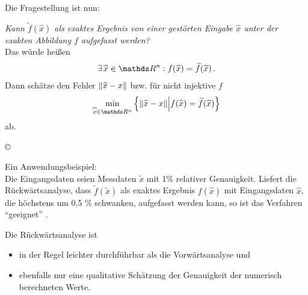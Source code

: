  
Die Fragestellung ist nun:

\textit{Kann $\widetilde{f}(\widehat{x})$ als exaktes Ergebnis von einer gestörten Eingabe $\widehat{x}$ unter der exakten Abbildung $f$ aufgefasst werden?}\\

Das würde heißen
\begin{gather*}
  \exists\, \widehat{x}\in \Ren: f(\widehat{x})= \widetilde{f}(\widetilde{x})\, .
\end{gather*}
Dann schätze den Fehler $ \nn[\widehat{x}-x]$
bzw. für nicht injektive $f$
\begin{gather*}
  \min_{\widehat{x}\in \Ren}
  \left\{
    \nn[\widehat{x}-x] 
    \middle\vert f(\widehat{x}) = \widetilde{f}(\widetilde{x}) 
  \right\}
\end{gather*} 
ab. 

\begin{image}{\copyright}
\end{image}

Ein Anwendungsbeispiel:\\
Die Eingangsdaten seien Messdaten $\tilde{x}$  mit 1\% relativer Genauigkeit. 
Liefert die Rückwärtsanalyse, dass $\tilde{f} (\tilde{x})$ als exaktes Ergebnis 
$f(\hat x)$ mit Eingangsdaten $\hat x$, 
die höchstens um 0,5 \% schwanken, aufgefasst werden kann,
so ist das Verfahren \enquote{geeignet} . 

Die Rückwärtsanalyse ist
\begin{itemize}
\item in der Regel leichter durchführbar als die
  Vorwärtsanalyse  und 
\item ebenfalls nur eine qualitative Schätzung der
  Genauigkeit der numerisch berechneten Werte.
\end{itemize}

